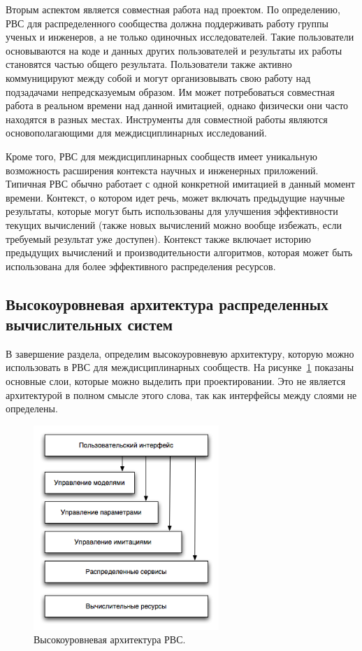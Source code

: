 Вторым аспектом является совместная работа над проектом. По определению, РВС для распределенного сообщества должна поддерживать работу группы ученых и инженеров, а не только одиночных исследователей. Такие пользователи основываются на коде и данных других пользователей и результаты их работы становятся частью общего результата. Пользователи также активно коммуницируют между собой и могут организовывать свою работу над подзадачами непредсказуемым образом. Им может потребоваться совместная работа в реальном времени над данной имитацией, однако физически они часто находятся в разных местах. Инструменты для совместной работы являются основополагающими для междисциплинарных исследований.

Кроме того, РВС для междисциплинарных сообществ имеет уникальную возможность расширения контекста научных и инженерных приложений. Типичная РВС обычно работает с одной конкретной имитацией в данный момент времени. Контекст, о котором идет речь, может включать предыдущие научные результаты, которые могут быть использованы для улучшения эффективности текущих вычислений (также новых вычислений можно вообще избежать, если требуемый результат уже доступен). Контекст также включает историю предыдущих вычислений и производительности алгоритмов, которая может быть использована для более эффективного распределения ресурсов. 

\subsection{Высокоуровневая архитектура распределенных вычислительных систем}
\label{architecture}

В завершение раздела, определим высокоуровневую архитектуру, которую можно использовать в РВС для междисциплинарных сообществ. На рисунке~\ref{fig:high-architecture} показаны основные слои, которые можно выделить при проектировании. Это не является архитектурой в полном смысле этого слова, так как интерфейсы между слоями не определены. 

\begin{figure}[tbh]
  \centering
    \includegraphics[width=7cm]{images/high-architecture.png}
  \caption{Высокоуровневая архитектура РВС.}
  \label{fig:high-architecture}
\end{figure}  
         
